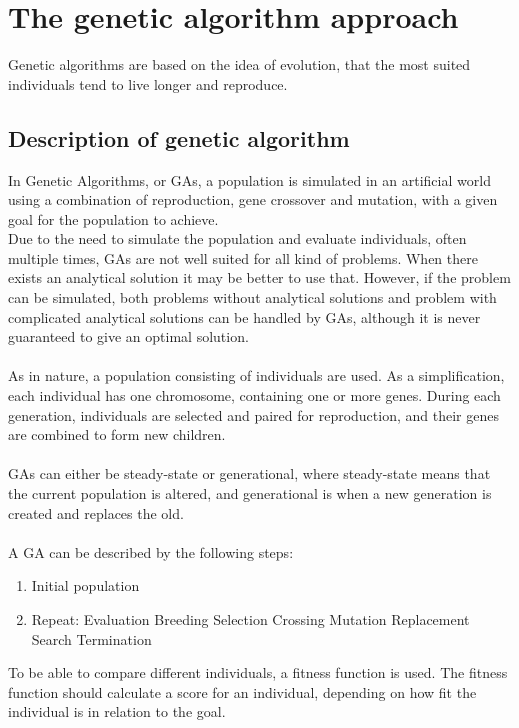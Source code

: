 \pagebreak
\section{The genetic algorithm approach}
Genetic algorithms are based on the idea of evolution, that the most suited individuals tend to live longer and reproduce. 
\subsection{Description of genetic algorithm}
In Genetic Algorithms, or GAs, a population is simulated in an artificial world using a combination of reproduction, gene crossover and mutation, with a given goal for the population to achieve.
\\
Due to the need to simulate the population and evaluate individuals, often multiple times, GAs are not well suited for all kind of problems. When there exists an analytical solution it may be better to use that. However, if the problem can be simulated, both problems without analytical solutions and problem with complicated analytical solutions can be handled by GAs, although it is never guaranteed to give an optimal solution.\\
\\
As in nature, a population consisting of individuals are used. As a simplification, each individual has one chromosome, containing one or more genes. During each generation, individuals are selected and paired for reproduction, and their genes are combined to form new children.\\
\\
GAs can either be steady-state or generational, where steady-state means that the current population is altered, and generational is when a new generation is created and replaces the old.\\
\\
A GA can be described by the following steps:
\begin{enumerate}
\item Initial population
\item Repeat:
\subitem Evaluation
\subitem Breeding
\subsubitem Selection
\subsubitem Crossing
\subsubitem Mutation
\subsubitem Replacement
\subitem Search Termination
\end{enumerate}
To be able to compare different individuals, a fitness function is used. The fitness function should calculate a score for an individual, depending on how fit the individual is in relation to the goal.

